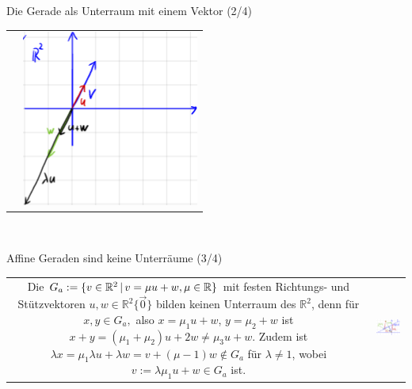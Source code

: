 \begin{Beispiel}
{Die Gerade als Unterraum mit einem Vektor (2/4)}
\begin{tabular}{c l}
\parbox[b]{10cm}{
} & \includegraphics[width=.2\textwidth]{Dateien/00/11GeradeUnterraum.PNG}
\end{tabular}\\
\end{Beispiel}
\begin{Beispiel}
{Affine Geraden sind keine Unterräume (3/4)}
\begin{tabular}{c l}
\parbox[b]{8cm}{
Die  $G_a:=\{v\in\mathbb{R}^2\,|\, v=\mu u+w,\mu\in\mathbb{R}\}$ mit festen Richtungs- und Stützvektoren $u,w\in\mathbb{R}^2\{\Vec{0}\}$ bilden keinen Unterraum des $\mathbb{R}^2$, denn\\
für $x,y\in G_a,$ also $x=\mu_1u+w$, $y=\mu_2+w$ ist\\
$x+y=(\mu_1+\mu_2)u+2w\neq \mu_3 u+w$.\\
Zudem ist $\lambda x=\mu_1\lambda u+ \lambda w=v+(\mu-1)w\notin G_a$ für $\lambda\neq1$, wobei $v:= \lambda \mu_1 u+w\in G_a$ ist.
} & \includegraphics[width=.4\textwidth]{Dateien/00/11KeinUnterraum.PNG}
\end{tabular}
\end{Beispiel}
